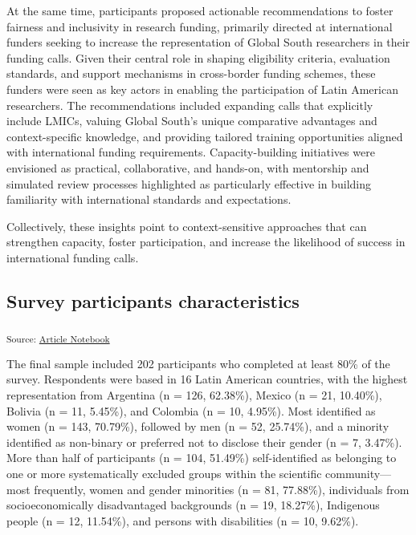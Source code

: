 \documentclass[
  letterpaper,
  DIV=11,
  numbers=noendperiod]{scrartcl}
\begin{document}
At the same time, participants proposed actionable recommendations to
foster fairness and inclusivity in research funding, primarily directed
at international funders seeking to increase the representation of
Global South researchers in their funding calls. Given their central
role in shaping eligibility criteria, evaluation standards, and support
mechanisms in cross-border funding schemes, these funders were seen as
key actors in enabling the participation of Latin American researchers.
The recommendations included expanding calls that explicitly include
LMICs, valuing Global South's unique comparative advantages and
context-specific knowledge, and providing tailored training
opportunities aligned with international funding requirements.
Capacity-building initiatives were envisioned as practical,
collaborative, and hands-on, with mentorship and simulated review
processes highlighted as particularly effective in building familiarity
with international standards and expectations.

Collectively, these insights point to context-sensitive approaches that
can strengthen capacity, foster participation, and increase the
likelihood of success in international funding calls.

\subsection{Survey participants
characteristics}\label{survey-participants-characteristics}

\textsubscript{Source:
\href{https://RLadies-BA.github.io/quarto-manuscripts/index-preview.html}{Article
Notebook}}

The final sample included 202 participants who completed at least 80\%
of the survey. Respondents were based in 16 Latin American countries,
with the highest representation from Argentina (n = 126, 62.38\%),
Mexico (n = 21, 10.40\%), Bolivia (n = 11, 5.45\%), and Colombia (n =
10, 4.95\%). Most identified as women (n = 143, 70.79\%), followed by
men (n = 52, 25.74\%), and a minority identified as non-binary or
preferred not to disclose their gender (n = 7, 3.47\%). More than half
of participants (n = 104, 51.49\%) self-identified as belonging to one
or more systematically excluded groups within the scientific
community---most frequently, women and gender minorities (n = 81,
77.88\%), individuals from socioeconomically disadvantaged backgrounds
(n = 19, 18.27\%), Indigenous people (n = 12, 11.54\%), and persons with
disabilities (n = 10, 9.62\%).
\end{document}
